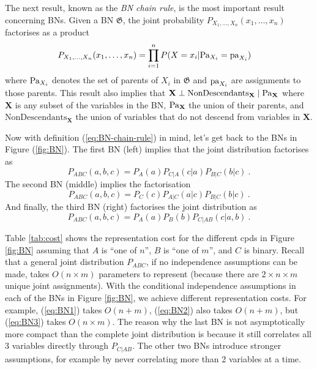 The next result, known as the \emph{BN chain rule}, is the most important result concerning BNs. 
Given a BN $\mathfrak G$, the joint probability $P_{X_1, \ldots, X_n}(x_1, \ldots, x_n)$ factorises as a product
\begin{align}\label{eq:BN-chain-rule}
P_{X_1, \ldots, X_n}(x_1, \ldots, x_n) &= \prod_{i=1}^n P(X=x_i|\mathbf{\text{Pa}}_{X_i}=\mathbf{\text{pa}}_{X_i}) 
\end{align}
where $\mathbf{\text{Pa}}_{X_i}$ denotes the set of parents of $X_i$ in $\mathfrak G$ and $\mathbf{\text{pa}}_{X_i}$ are assignments to those parents. This result also implies that $\mathbf X \perp \text{NonDescendants}_{\mathbf X} \mid \mathbf{\text{Pa}}_{\mathbf X}$ where $\mathbf X$ is any subset of the variables in the BN, $\mathbf{\text{Pa}}_{\mathbf X}$ the union of their parents, and $\text{NonDescendants}_{\mathbf X}$ the union of variables that do not descend from variables in $\mathbf X$.

Now with definition (\ref{eq:BN-chain-rule}) in mind, let's get back to the BNs in Figure (\ref{fig:BN}).
The first BN (left) implies that the joint distribution factorises as 
\begin{equation}\label{eq:BN1}
P_{ABC}(a,b,c) = P_A(a)P_{C|A}(c|a)P_{B|C}(b|c) ~ .
\end{equation}
The second BN (middle) implies the factorisation 
\begin{equation}\label{eq:BN2}
P_{ABC}(a,b,c) = P_C(c)P_{A|C}(a|c)P_{B|C}(b|c) ~ .
\end{equation}	
And finally, the third BN (right) factorises the joint distribution as 
\begin{equation}\label{eq:BN3}
P_{ABC}(a,b,c) = P_A(a)P_B(b)P_{C|AB}(c|a,b) ~ .
\end{equation}

Table \ref{tab:cost} shows the representation cost for the different cpds in Figure \ref{fig:BN} assuming that $A$ is ``one of $n$'', $B$ is ``one of $m$'', and $C$ is binary.
Recall that a general joint distribution $P_{ABC}$, if no independence assumptions can be made, takes $O(n \times m)$ parameters to represent (because there are $2 \times n \times m$ unique joint assignments). 
With the conditional independence assumptions in each of the BNs in Figure \ref{fig:BN}, we achieve different representation costs. 
For example, (\ref{eq:BN1}) takes $O(n + m)$, (\ref{eq:BN2}) also takes $O(n + m)$, but (\ref{eq:BN3}) takes $O(n \times m)$.
The reason why the last BN is not asymptotically more compact than the complete joint distribution is because it still correlates all $3$ variables directly through $P_{C|AB}$.
The other two BNs introduce stronger assumptions, for example by never correlating more than 2 variables at a time. 
	
